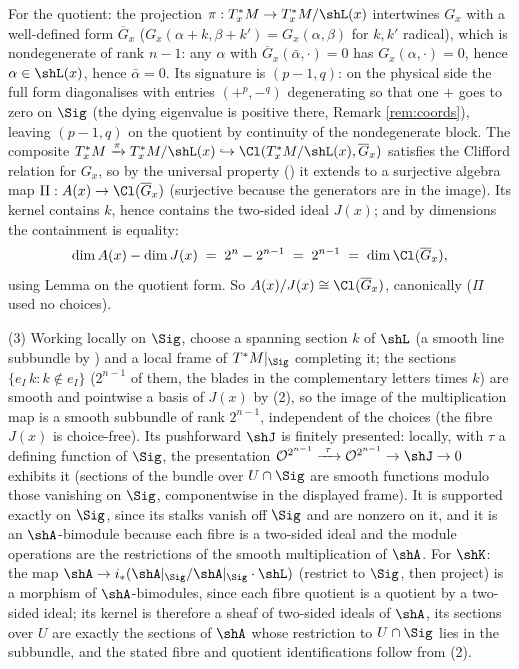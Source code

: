For the quotient: the projection $\pi : T^*_xM \to T^*_xM/\shL(x)$ intertwines $G_x$ with a well-defined form $\overline{G}_x$ ($G_x(\alpha + k, \beta + k') = G_x(\alpha, \beta)$ for $k, k'$ radical), which is nondegenerate of rank $n - 1$: any $\alpha$ with $\overline{G}_x(\bar\alpha, \cdot) = 0$ has $G_x(\alpha, \cdot) = 0$, hence $\alpha \in \shL(x)$, hence $\bar\alpha = 0$. Its signature is $(p{-}1, q)$: on the physical side the full form diagonalises with entries $(+^{p}, -^{q})$ degenerating so that one $+$ goes to zero on $\Sig$ (the dying eigenvalue is positive there, Remark \ref{rem:coords}), leaving $(p{-}1, q)$ on the quotient by continuity of the nondegenerate block. The composite $T^*_xM \xrightarrow{\pi} T^*_xM/\shL(x) \hookrightarrow \Cl(T^*_xM/\shL(x), \overline{G}_x)$ satisfies the Clifford relation for $G_x$, so by the universal property () it extends to a surjective algebra map $\Pi : A(x) \to \Cl(\overline{G}_x)$ (surjective because the generators are in the image). Its kernel contains $k$, hence contains the two-sided ideal $J(x)$; and by dimensions the containment is equality:
\[
\dim A(x) - \dim J(x) \;=\; 2^n - 2^{n-1} \;=\; 2^{n-1} \;=\; \dim \Cl(\overline{G}_x),
\]
using Lemma  on the quotient form. So $A(x)/J(x) \cong \Cl(\overline{G}_x)$, canonically ($\Pi$ used no choices).

(3) Working locally on $\Sig$, choose a spanning section $k$ of $\shL$ (a smooth line subbundle by ) and a local frame of $T^*M|_\Sig$ completing it; the sections $\{e_I\, k : k \notin e_I\}$ ($2^{n-1}$ of them, the blades in the complementary letters times $k$) are smooth and pointwise a basis of $J(x)$ by (2), so the image of the multiplication map is a smooth subbundle of rank $2^{n-1}$, independent of the choices (the fibre $J(x)$ is choice-free). Its pushforward $\shJ$ is finitely presented: locally, with $\tau$ a defining function of $\Sig$, the presentation $\mathcal{O}^{2^{n-1}} \xrightarrow{\ \tau\ } \mathcal{O}^{2^{n-1}} \to \shJ \to 0$ exhibits it (sections of the bundle over $U \cap \Sig$ are smooth functions modulo those vanishing on $\Sig$, componentwise in the displayed frame). It is supported exactly on $\Sig$, since its stalks vanish off $\Sig$ and are nonzero on it, and it is an $\shA$-bimodule because each fibre is a two-sided ideal and the module operations are the restrictions of the smooth multiplication of $\shA$. For $\shK$: the map $\shA \to i_*(\shA|_\Sig / \shA|_\Sig \cdot \shL)$ (restrict to $\Sig$, then project) is a morphism of $\shA$-bimodules, since each fibre quotient is a quotient by a two-sided ideal; its kernel is therefore a sheaf of two-sided ideals of $\shA$, its sections over $U$ are exactly the sections of $\shA$ whose restriction to $U \cap \Sig$ lies in the subbundle, and the stated fibre and quotient identifications follow from (2).
